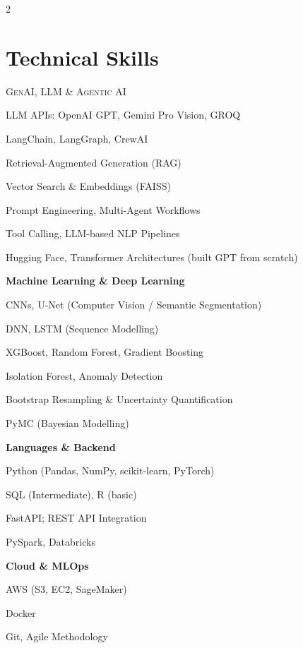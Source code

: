 \documentclass[9pt]{extarticle}
\newcommand{\skillhead}[1]{{\scshape\color{accent}\fontsize{8.4}{10}\selectfont #1}\par\vspace{2pt}}
\newcommand{\skillsub}[1]{{\bfseries\fontsize{8.2}{9.8}\selectfont #1}\par\vspace{2pt}}
\begin{document}
\begin{paracol}{2}
\switchcolumn

\section*{Technical Skills}

\skillhead{GenAI, LLM \& Agentic AI}
\begin{skills}
  \item LLM APIs: OpenAI GPT, Gemini Pro Vision, GROQ
  \item LangChain, LangGraph, CrewAI
  \item Retrieval-Augmented Generation (RAG)
  \item Vector Search \& Embeddings (FAISS)
  \item Prompt Engineering, Multi-Agent Workflows
  \item Tool Calling, LLM-based NLP Pipelines
  \item Hugging Face, Transformer Architectures (built GPT from scratch)
\end{skills}

\skillsub{Machine Learning \& Deep Learning}
\begin{skills}
  \item CNNs, U-Net (Computer Vision / Semantic Segmentation)
  \item DNN, LSTM (Sequence Modelling)
  \item XGBoost, Random Forest, Gradient Boosting
  \item Isolation Forest, Anomaly Detection
  \item Bootstrap Resampling \& Uncertainty Quantification
  \item PyMC (Bayesian Modelling)
\end{skills}

\skillsub{Languages \& Backend}
\begin{skills}
  \item Python (Pandas, NumPy, scikit-learn, PyTorch)
  \item SQL (Intermediate), R (basic)
  \item FastAPI; REST API Integration
  \item PySpark, Databricks
\end{skills}

\skillsub{Cloud \& MLOps}
\begin{skills}
  \item AWS (S3, EC2, SageMaker)
  \item Docker
  \item Git, Agile Methodology
\end{skills}

\end{paracol}
\end{document}
